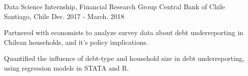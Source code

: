 \begin{cventries}
\cventry
{Data Science Internship, Financial Research Group} %
{Central Bank of Chile} %
{Santiago, Chile} %
{Dec. 2017 - March. 2018} %
{
  \begin{cvitems} %
    \item {Partnered with economists to analyze survey data about debt underreporting in Chilean households, and it's policy implications.}
    \item {Quantified the influence of debt-type and household size in debt underreporting, using regression models in STATA and R.}
  \end{cvitems}
}
\end{cventries}

